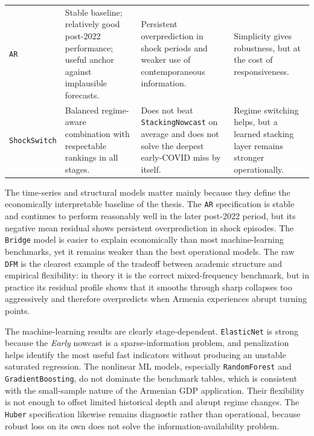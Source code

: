 \documentclass[12pt,a4paper]{article}
\begin{document}
\begin{table}[H]
\begin{tabularx}{\textwidth}{>{\raggedright\arraybackslash}p{3.9cm}YYY}
        \texttt{AR} & Stable baseline; relatively good post-2022 performance; useful anchor against implausible forecasts. & Persistent overprediction in shock periods and weaker use of contemporaneous information. & Simplicity gives robustness, but at the cost of responsiveness. \\
        \texttt{ShockSwitch} & Balanced regime-aware combination with respectable rankings in all stages. & Does not beat \texttt{StackingNowcast} on average and does not solve the deepest early-COVID miss by itself. & Regime switching helps, but a learned stacking layer remains stronger operationally. \\
        \bottomrule
    \end{tabularx}
\end{table}

The time-series and structural models matter mainly because they define the economically interpretable baseline of the thesis. The \texttt{AR} specification is stable and continues to perform reasonably well in the later post-2022 period, but its negative mean residual shows persistent overprediction in shock episodes. The \texttt{Bridge} model is easier to explain economically than most machine-learning benchmarks, yet it remains weaker than the best operational models. The raw \texttt{DFM} is the clearest example of the tradeoff between academic structure and empirical flexibility: in theory it is the correct mixed-frequency benchmark, but in practice its residual profile shows that it smooths through sharp collapses too aggressively and therefore overpredicts when Armenia experiences abrupt turning points.

The machine-learning results are clearly stage-dependent. \texttt{ElasticNet} is strong because the \textit{Early} nowcast is a sparse-information problem, and penalization helps identify the most useful fast indicators without producing an unstable saturated regression. The nonlinear ML models, especially \texttt{RandomForest} and \texttt{GradientBoosting}, do not dominate the benchmark tables, which is consistent with the small-sample nature of the Armenian GDP application. Their flexibility is not enough to offset limited historical depth and abrupt regime changes. The \texttt{Huber} specification likewise remains diagnostic rather than operational, because robust loss on its own does not solve the information-availability problem.
\end{document}
